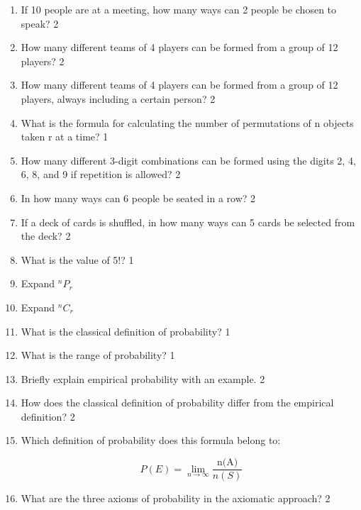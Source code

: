 \documentclass[a4paper,oneside, margin=1.4in]{book}
\begin{document}
\begin{enumerate}
\item If 10 people are at a meeting, how many ways can 2 people be chosen to speak? \hfill 2

\item How many different teams of 4 players can be formed from a group of 12 players? \hfill 2

\item How many different teams of 4 players can be formed from a group of 12 players, always including a certain person? \hfill 2

\item What is the formula for calculating the number of permutations of n objects taken r at a time? \hfill 1

\item How many different 3-digit combinations can be formed using the digits 2, 4, 6, 8, and 9 if repetition is allowed? \hfill 2

\item In how many ways can 6 people be seated in a row? \hfill 2

\item If a deck of cards is shuffled, in how many ways can 5 cards be selected from the deck? \hfill 2

\item What is the value of 5!? \hfill 1

\item Expand ${}^nP_r$

\item Expand ${}^nC_r$

\item What is the classical definition of probability? \hfill 1

\item What is the range of probability? \hfill 1

\item Briefly explain empirical probability with an example. \hfill 2

\item How does the classical definition of probability differ from the empirical definition? \hfill 2

\item Which definition of probability does this formula belong to: 

\[
P(E) = \lim_{n \to \infty} \frac{\text{n(A)}}{n(S)}
\]

\item What are the three axioms of probability in the axiomatic approach? \hfill 2


\end{enumerate}
\end{document}
